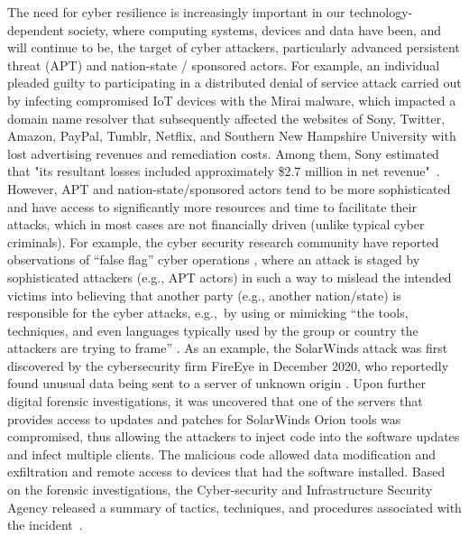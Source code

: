 The need for cyber resilience is increasingly important in our
technology-dependent society, where computing systems, devices and
data have been, and will continue to be, the target of cyber
attackers, particularly advanced persistent threat (APT) and
nation-state / sponsored actors. For example, an individual pleaded
guilty to participating in a distributed denial of service attack
carried out by infecting compromised IoT devices with the Mirai
malware, which impacted a domain name resolver that subsequently
affected the websites of Sony, Twitter, Amazon, PayPal, Tumblr,
Netflix, and Southern New Hampshire University with lost advertising
revenues and remediation costs. Among them, Sony estimated that "its
resultant losses included approximately \$2.7 million in net
revenue"~\cite{USDoJMirai2020}. However, APT and
nation-state/sponsored actors tend to be more sophisticated and have
access to significantly more resources and time to facilitate their
attacks, which in most cases are not financially driven (unlike
typical cyber criminals). For example, the cyber security research
community have reported observations of “false flag” cyber
operations \cite{geers2014world,Leyden2019}, where an attack is staged
by sophisticated attackers (e.g., APT actors) in such a way to mislead
the intended victims into believing that another party (e.g., another
nation/state) is responsible for the cyber attacks, e.g.,~by using or
mimicking ``the tools, techniques, and even languages typically used
by the group or country the attackers are trying to
frame'' \cite{Fruhlinger2020}.
As an example, the SolarWinds attack was first discovered by the
cybersecurity firm FireEye in December 2020, who reportedly found
unusual data being sent to a server of unknown
origin \cite{FireEyeUNC2452}. Upon further digital forensic
investigations, it was uncovered that one of the servers that provides
access to updates and patches for SolarWinds Orion tools was
compromised, thus allowing the attackers to inject code into the
software updates and infect multiple clients. The malicious code
allowed data modification and exfiltration and remote access to
devices that had the software installed. Based on the forensic
investigations, the Cyber-security and Infrastructure Security Agency
released a summary of tactics, techniques, and procedures associated
with the incident~\cite{CISA2021}.

